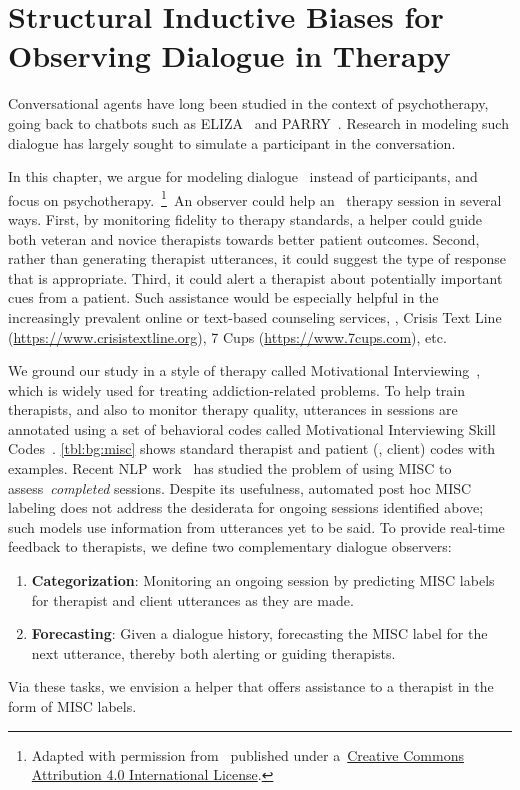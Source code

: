\chapter[Structural Inductive Biases for Observing Dialogue in \\
  Therapy]{Structural Inductive Biases for Observing Dialogue in
  Therapy}
\label{chap:snt}

Conversational agents have long been studied in the context of
psychotherapy, going back to chatbots such as
ELIZA~\citep{weizenbaum1966eliza} and
PARRY~\citep{colby1975artificial}. Research in modeling such dialogue
has largely sought to simulate a participant in the conversation.

In this chapter, we argue for modeling dialogue~ instead
of participants, and focus on psychotherapy.~\footnote{Adapted with
  permission from~\citet{jie2019psycdialacl} published under
  a~\href{https://creativecommons.org/licenses/by/4.0/}{Creative
    Commons Attribution 4.0 International License}.}~An observer could
help an~ therapy session in several ways.  First, by
monitoring fidelity to therapy standards, a helper could guide both
veteran and novice therapists towards better patient outcomes. Second,
rather than generating therapist utterances, it could suggest the type
of response that is appropriate. Third, it could alert a therapist
about potentially important cues from a patient.
%
Such assistance would be especially helpful in the increasingly
prevalent online or text-based counseling services, \eg, Crisis Text
Line (\url{https://www.crisistextline.org}), 7 Cups
(\url{https://www.7cups.com}), etc.

We ground our study in a style of therapy called Motivational
Interviewing~\citep[MI,][]{miller2003motivational,miller2012motivational},
which is widely used for treating addiction-related problems.
%
To help train therapists, and also to monitor therapy quality,
utterances in sessions are annotated using a set of behavioral codes
called Motivational Interviewing Skill
Codes~\citep[MISC,][]{miller2003manual}. \autoref{tbl:bg:misc} shows
standard therapist and patient (\ie, client) codes with
examples. Recent NLP work~\cite[][{\em inter
  alia}]{tanana2016comparison, xiao2016behavioral,
  perez2017predicting, huang2018modeling} has studied the problem of
using MISC to assess~\emph{completed} sessions.  Despite its
usefulness, automated post hoc MISC labeling does not address the
desiderata for ongoing sessions identified above; such models use
information from utterances yet to be said. To provide real-time
feedback to therapists, we define two complementary dialogue
observers:
\begin{enumerate}[nosep]
\item \textbf{Categorization}: Monitoring an ongoing session by
  predicting MISC labels for therapist and client utterances as they
  are made.
\item \textbf{Forecasting}: Given a dialogue history, forecasting
  the MISC label for the next utterance, thereby both alerting or
  guiding therapists.
\end{enumerate}
Via these tasks, we envision a helper that offers assistance to a
therapist in the form of MISC labels.


